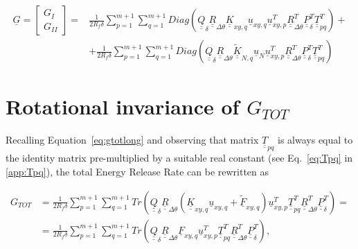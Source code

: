 \documentclass[review]{elsarticle}
\begin{document}
\begin{equation}
\begin{split}
\underline{G}=\begin{bmatrix}
G_{I} \\
G_{II}
\end{bmatrix}=&\frac{1}{2R_{f}\delta}\sum_{p=1}^{m+1}\sum_{q=1}^{m+1}Diag\left(\underline{\underline{Q}}_{\delta}\underline{\underline{R}}_{\Delta\theta}\underline{\underline{K}}_{xy,q}\underline{u}_{xy,q}\underline{u}_{xy,p}^{T}\underline{\underline{R}}_{\Delta\theta}^{T}\underline{\underline{P}}_{\delta}^{T}\underline{\underline{T}}_{pq}^{T}\right)+\\
&+\frac{1}{2R_{f}\delta}\sum_{p=1}^{m+1}\sum_{q=1}^{m+1}Diag\left(\underline{\underline{Q}}_{\delta}\underline{\underline{R}}_{\Delta\theta}\underline{\underline{\widetilde{K}}}_{N,q}\underline{u}_{N}\underline{u}_{xy,p}^{T}\underline{\underline{R}}_{\Delta\theta}^{T}\underline{\underline{P}}_{\delta}^{T}\underline{\underline{T}}_{pq}^{T}\right)
\end{split}
\end{equation}

\section{Rotational invariance of $G_{TOT}$}

Recalling Equation~\ref{eq:gtotlong} and observing that matrix $\underline{\underline{T}}_{pq}$ is always equal to the identity matrix pre-multiplied by a suitable real constant (see Eq.~\ref{eq:Tpq} in \ref{app:Tpq}), the total Energy Release Rate can be rewritten as

\begin{equation}\label{eq:gtotlong1}
\begin{split}
G_{TOT}&=\frac{1}{2R_{f}\delta}\sum_{p=1}^{m+1}\sum_{q=1}^{m+1}Tr\left(\underline{\underline{Q}}_{\delta}\underline{\underline{R}}_{\Delta\theta}\left(\underline{\underline{K}}_{xy,q}\underline{u}_{xy,q}+\underline{\widetilde{F}}_{xy,q}\right)\underline{u}_{xy,p}^{T}\underline{\underline{T}}_{pq}^{T}\underline{\underline{R}}_{\Delta\theta}^{T}\underline{\underline{P}}_{\delta}^{T}\right)=\\
&=\frac{1}{2R_{f}\delta}\sum_{p=1}^{m+1}\sum_{q=1}^{m+1}Tr\left(\underline{\underline{Q}}_{\delta}\underline{\underline{R}}_{\Delta\theta}\underline{F}_{xy,q}\underline{u}_{xy,p}^{T}\underline{\underline{T}}_{pq}^{T}\underline{\underline{R}}_{\Delta\theta}^{T}\underline{\underline{P}}_{\delta}^{T}\right),
\end{split}
\end{equation}
\end{document}
